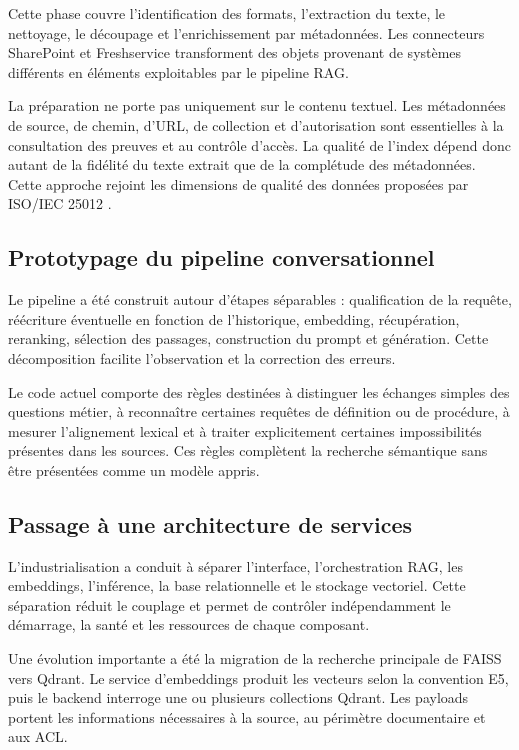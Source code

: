 Cette phase couvre l'identification des formats, l'extraction du texte, le nettoyage, le découpage et l'enrichissement par métadonnées. Les connecteurs SharePoint et Freshservice transforment des objets provenant de systèmes différents en éléments exploitables par le pipeline RAG.

La préparation ne porte pas uniquement sur le contenu textuel. Les métadonnées de source, de chemin, d'URL, de collection et d'autorisation sont essentielles à la consultation des preuves et au contrôle d'accès. La qualité de l'index dépend donc autant de la fidélité du texte extrait que de la complétude des métadonnées. Cette approche rejoint les dimensions de qualité des données proposées par ISO/IEC 25012 \citep{ISO25012_2008}.

\subsection{Prototypage du pipeline conversationnel}

Le pipeline a été construit autour d'étapes séparables : qualification de la requête, réécriture éventuelle en fonction de l'historique, embedding, récupération, reranking, sélection des passages, construction du prompt et génération. Cette décomposition facilite l'observation et la correction des erreurs.

Le code actuel comporte des règles destinées à distinguer les échanges simples des questions métier, à reconnaître certaines requêtes de définition ou de procédure, à mesurer l'alignement lexical et à traiter explicitement certaines impossibilités présentes dans les sources. Ces règles complètent la recherche sémantique sans être présentées comme un modèle appris.

\subsection{Passage à une architecture de services}

L'industrialisation a conduit à séparer l'interface, l'orchestration RAG, les embeddings, l'inférence, la base relationnelle et le stockage vectoriel. Cette séparation réduit le couplage et permet de contrôler indépendamment le démarrage, la santé et les ressources de chaque composant.

Une évolution importante a été la migration de la recherche principale de FAISS vers Qdrant. Le service d'embeddings produit les vecteurs selon la convention E5, puis le backend interroge une ou plusieurs collections Qdrant. Les payloads portent les informations nécessaires à la source, au périmètre documentaire et aux ACL.

